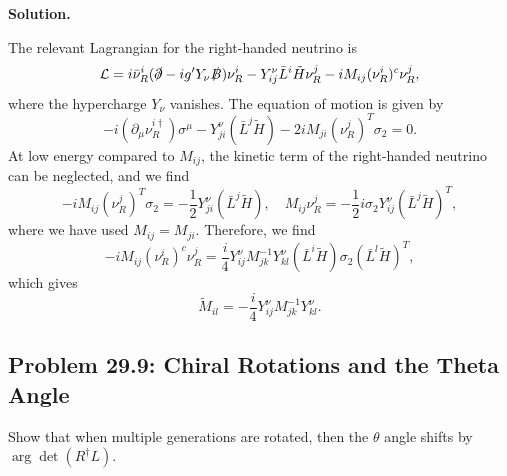 \documentclass[a4paper,11pt]{article}
\newenvironment{solution}{\par\medskip\noindent\textbf{Solution.}\par\smallskip}{\par\medskip}
\begin{document}
\begin{solution}
    The relevant Lagrangian for the right-handed neutrino is
    \begin{equation}
        \mathcal{L} =i\bar\nu^i_R(\slashed{\partial}-ig'Y_\nu \slashed{B})\nu_R^i - Y_{ij}^\nu\bar L^i\tilde{H}\nu_R^j - iM_{ij}(\nu_R^i)^c\nu_R^j,
    \end{equation}
    where the hypercharge $Y_\nu$ vanishes. The equation of motion is given by
    \begin{equation}
        -i(\partial_\mu \nu_R^{i\dagger})\sigma^\mu  - Y_{ji}^{\nu}(\bar L^j \tilde H) -2iM_{ji}(\nu_R^{j})^T\sigma_2 = 0.
    \end{equation}
    At low energy compared to $M_{ij}$, the kinetic term of the right-handed neutrino can be neglected, and we find
    \begin{equation}
        -iM_{ij}(\nu_R^j)^T\sigma_2 = -\frac{1}{2}Y^\nu_{ji}(\bar L^j\tilde H), \quad M_{ij}\nu_R^j = -\frac{1}{2}i\sigma_2Y^\nu_{ij}(\bar L^j\tilde H)^T,
    \end{equation}
    where we have used $M_{ij} = M_{ji}$.
    Therefore, we find
    \begin{equation}
        -iM_{ij}(\nu_R^i)^c\nu_R^j = \frac{i}{4}Y_{ij}^\nu M^{-1}_{jk}Y_{kl}^\nu(\bar L^i\tilde H) \sigma_2(\bar L^l\tilde H)^T,
    \end{equation}
    which gives
    \begin{equation}
    \boxed{
        \widetilde M_{il} = - \frac{i}{4}Y_{ij}^\nu M^{-1}_{jk}Y_{kl}^\nu.
        }
    \end{equation}

\end{solution}

\subsection[Problem 29.9: Chiral rotations and the \texorpdfstring{$\theta$}{theta} angle]{Problem 29.9: Chiral Rotations and the Theta Angle}

Show that when multiple generations are rotated, then the $\theta$ angle shifts
by $\arg\det(R^\dagger L)$.
\end{document}
